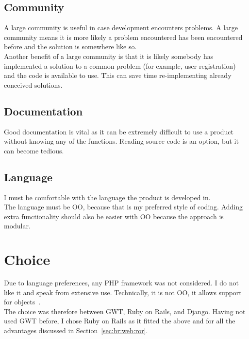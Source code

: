 \subsection{Community}
\label{sec:web:req:community}

A large community is useful in case development encounters problems. A large community means it is more likely a problem encountered has been encountered before and the solution is somewhere like \gls{so}. \\

Another benefit of a large community is that it is likely somebody has implemented a solution to a common problem (for example, user registration) and the code is available to use. This can save time re-implementing already conceived solutions.

\subsection{Documentation}
\label{sec:web:req:documentation}

Good documentation is vital as it can be extremely difficult to use a product without knowing any of the functions. Reading source code is an option, but it can become tedious.

\subsection{Language}
\label{sec:web:req:language}

I must be comfortable with the language the product is developed in. \\

The language must be \gls{OO}, because that is my preferred style of coding. Adding extra functionality should also be easier with \gls{OO} because the approach is modular.

\section{Choice}
\label{sec:web:choice}

Due to language preferences, any PHP framework was not considered. I do not like it and speak from extensive use. Technically, it is not \gls{OO}, it allows support for objects~\cite{phpoo}. \\

The choice was therefore between \gls{GWT}, Ruby on Rails, and Django. Having not used \gls{GWT} before, I chose Ruby on Rails as it fitted the above and for all the advantages discussed in Section~\ref{sec:br:web:ror}. \\

